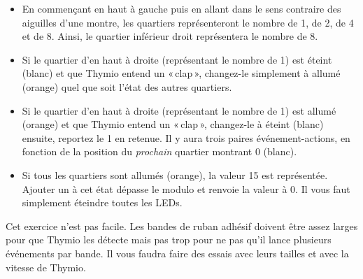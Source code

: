 \begin{itemize}
\item En commençant en haut à gauche puis en allant dans le sens contraire des aiguilles d'une montre,
les quartiers représenteront le nombre de 1, de 2, de 4
et de 8.
Ainsi, le quartier inférieur droit représentera le nombre de 8.
\item Si le quartier d'en haut à droite (représentant le nombre de 1) est éteint (blanc) et que Thymio entend un «\,clap\,», changez-le simplement à allumé (orange) quel que soit l'état des autres quartiers.
\item Si le quartier d'en haut à droite (représentant le nombre de 1) est allumé (orange) et que Thymio entend un «\,clap\,», changez-le à éteint (blanc) ensuite, reportez le 1 en retenue.
Il y aura trois paires événement-actions, en fonction de la position du \emph{prochain} quartier montrant 0 (blanc).
\item Si tous les quartiers sont allumés (orange), la valeur 15 est représentée. Ajouter un à cet état dépasse le modulo et renvoie la valeur à 0. Il vous faut simplement éteindre toutes les LEDs.
\end{itemize}

\bigskip


\bigskip


\bigskip

Cet exercice n'est pas facile.
Les bandes de ruban adhésif doivent être assez larges
pour que Thymio les détecte mais pas trop
pour ne pas qu'il lance plusieurs événements par bande.
Il vous faudra faire des essais avec leurs tailles et avec la vitesse de Thymio.

